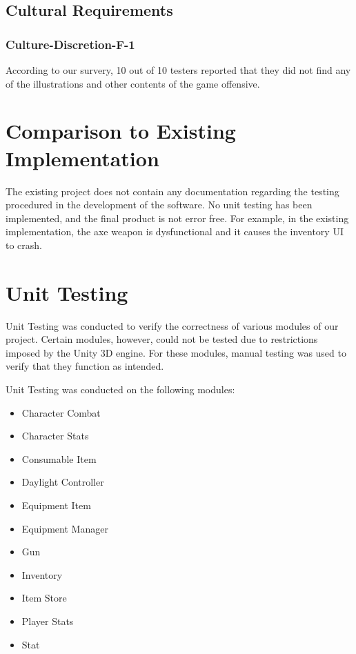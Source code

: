 \documentclass[12pt, titlepage]{article}
\begin{document}
\subsection{Cultural Requirements}
	\subsubsection{Culture-Discretion-F-1}
	
	According to our survery, 10 out of 10 testers reported that they did not find any of the illustrations and other contents of the game offensive.
	
\section{Comparison to Existing Implementation}	

The existing project does not contain any documentation regarding the testing procedured in the development of the software. No unit testing has been implemented, and the final product is not error free. For example, in the existing implementation, the axe weapon is dysfunctional and it causes the inventory UI to crash.

\section{Unit Testing}
Unit Testing was conducted to verify the correctness of various modules of our project. Certain modules, however, could not be tested due to restrictions imposed by the Unity 3D engine. For these modules, manual testing was used to verify that they function as intended.

Unit Testing was conducted on the following modules:
\begin{itemize}
	\item Character Combat
	\item Character Stats
	\item Consumable Item
	\item Daylight Controller
	\item Equipment Item
	\item Equipment Manager
	\item Gun
	\item Inventory
	\item Item Store
	\item Player Stats
	\item Stat
\end{itemize}
\end{document}
